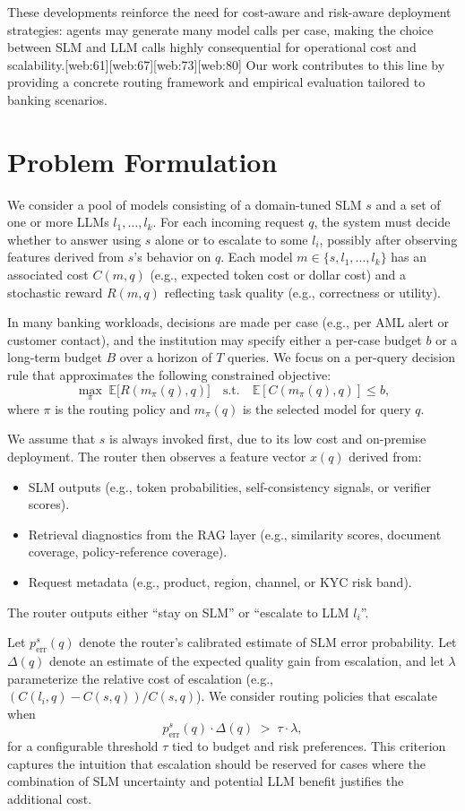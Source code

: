 \documentclass[11pt]{article}
\begin{document}
These developments reinforce the need for cost-aware and risk-aware deployment strategies: agents may generate many model calls per case, making the choice between SLM and LLM calls highly consequential for operational cost and scalability.[web:61][web:67][web:73][web:80] Our work contributes to this line by providing a concrete routing framework and empirical evaluation tailored to banking scenarios.

\section{Problem Formulation}

We consider a pool of models consisting of a domain-tuned SLM $s$ and a set of one or more LLMs $l_1,\dots,l_k$. For each incoming request $q$, the system must decide whether to answer using $s$ alone or to escalate to some $l_i$, possibly after observing features derived from $s$'s behavior on $q$. Each model $m \in \{s,l_1,\dots,l_k\}$ has an associated cost $C(m,q)$ (e.g., expected token cost or dollar cost) and a stochastic reward $R(m,q)$ reflecting task quality (e.g., correctness or utility).

In many banking workloads, decisions are made per case (e.g., per AML alert or customer contact), and the institution may specify either a per-case budget $b$ or a long-term budget $B$ over a horizon of $T$ queries. We focus on a per-query decision rule that approximates the following constrained objective:
\[
\max_{\pi} \; \mathbb{E}\big[ R(m_\pi(q), q) \big] \quad \text{s.t.} \quad \mathbb{E}[C(m_\pi(q),q)] \leq b,
\]
where $\pi$ is the routing policy and $m_\pi(q)$ is the selected model for query $q$.

We assume that $s$ is always invoked first, due to its low cost and on-premise deployment. The router then observes a feature vector $x(q)$ derived from:
\begin{itemize}
    \item SLM outputs (e.g., token probabilities, self-consistency signals, or verifier scores).
    \item Retrieval diagnostics from the RAG layer (e.g., similarity scores, document coverage, policy-reference coverage).
    \item Request metadata (e.g., product, region, channel, or KYC risk band).
\end{itemize}
The router outputs either ``stay on SLM'' or ``escalate to LLM $l_i$''. 

Let $p_{\text{err}}^s(q)$ denote the router's calibrated estimate of SLM error probability. Let $\Delta(q)$ denote an estimate of the expected quality gain from escalation, and let $\lambda$ parameterize the relative cost of escalation (e.g., $(C(l_i,q)-C(s,q))/C(s,q)$). We consider routing policies that escalate when
\[
p_{\text{err}}^s(q) \cdot \Delta(q) \;>\; \tau \cdot \lambda,
\]
for a configurable threshold $\tau$ tied to budget and risk preferences. This criterion captures the intuition that escalation should be reserved for cases where the combination of SLM uncertainty and potential LLM benefit justifies the additional cost.
\end{document}

